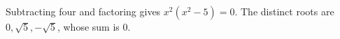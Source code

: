 Subtracting four and factoring gives $ x^2(x^2-5)=0 $. The distinct roots are $ 0,\sqrt5,-\sqrt5 $, whose sum is $\boxed0 $.

